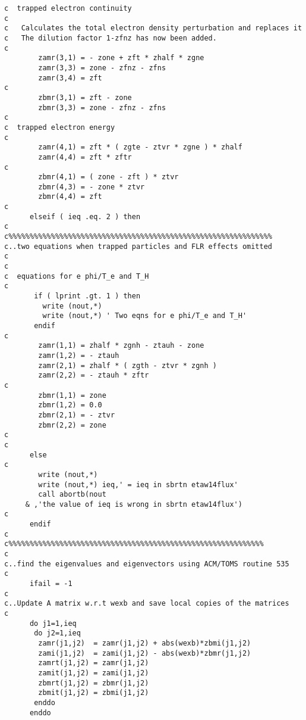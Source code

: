 \begin{verbatim}
c  trapped electron continuity
c
c   Calculates the total electron density perturbation and replaces it
c   The dilution factor 1-zfnz has now been added.
c
        zamr(3,1) = - zone + zft * zhalf * zgne
        zamr(3,3) = zone - zfnz - zfns
        zamr(3,4) = zft
c
        zbmr(3,1) = zft - zone
        zbmr(3,3) = zone - zfnz - zfns
c
c  trapped electron energy
c
        zamr(4,1) = zft * ( zgte - ztvr * zgne ) * zhalf
        zamr(4,4) = zft * zftr
c
        zbmr(4,1) = ( zone - zft ) * ztvr
        zbmr(4,3) = - zone * ztvr
        zbmr(4,4) = zft
c
      elseif ( ieq .eq. 2 ) then
c
c%%%%%%%%%%%%%%%%%%%%%%%%%%%%%%%%%%%%%%%%%%%%%%%%%%%%%%%%%%%%%%
c..two equations when trapped particles and FLR effects omitted
c
c
c  equations for e phi/T_e and T_H
c
       if ( lprint .gt. 1 ) then
         write (nout,*)
         write (nout,*) ' Two eqns for e phi/T_e and T_H'
       endif
c
        zamr(1,1) = zhalf * zgnh - ztauh - zone
        zamr(1,2) = - ztauh
        zamr(2,1) = zhalf * ( zgth - ztvr * zgnh )
        zamr(2,2) = - ztauh * zftr
c
        zbmr(1,1) = zone
        zbmr(1,2) = 0.0
        zbmr(2,1) = - ztvr
        zbmr(2,2) = zone
c
c
      else
c
        write (nout,*)
        write (nout,*) ieq,' = ieq in sbrtn etaw14flux'
        call abortb(nout
     & ,'the value of ieq is wrong in sbrtn etaw14flux')
c
      endif
c
c%%%%%%%%%%%%%%%%%%%%%%%%%%%%%%%%%%%%%%%%%%%%%%%%%%%%%%%%%%%%
c
c..find the eigenvalues and eigenvectors using ACM/TOMS routine 535
c
      ifail = -1
c
c..Update A matrix w.r.t wexb and save local copies of the matrices
c
      do j1=1,ieq
       do j2=1,ieq
        zamr(j1,j2)  = zamr(j1,j2) + abs(wexb)*zbmi(j1,j2)
        zami(j1,j2)  = zami(j1,j2) - abs(wexb)*zbmr(j1,j2)
        zamrt(j1,j2) = zamr(j1,j2) 
        zamit(j1,j2) = zami(j1,j2) 
        zbmrt(j1,j2) = zbmr(j1,j2) 
        zbmit(j1,j2) = zbmi(j1,j2) 
       enddo
      enddo


\end{verbatim}
